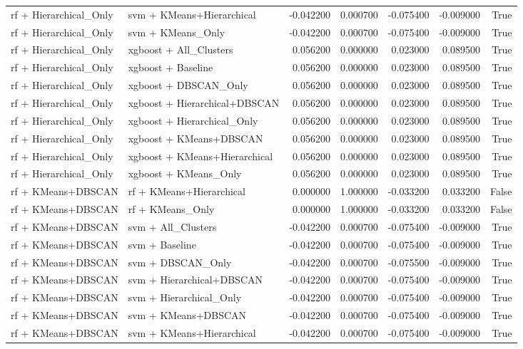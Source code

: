 \begin{tabular}{llrrrrr}
rf + Hierarchical_Only & svm + KMeans+Hierarchical & -0.042200 & 0.000700 & -0.075400 & -0.009000 & True \\
rf + Hierarchical_Only & svm + KMeans_Only & -0.042200 & 0.000700 & -0.075400 & -0.009000 & True \\
rf + Hierarchical_Only & xgboost + All_Clusters & 0.056200 & 0.000000 & 0.023000 & 0.089500 & True \\
rf + Hierarchical_Only & xgboost + Baseline & 0.056200 & 0.000000 & 0.023000 & 0.089500 & True \\
rf + Hierarchical_Only & xgboost + DBSCAN_Only & 0.056200 & 0.000000 & 0.023000 & 0.089500 & True \\
rf + Hierarchical_Only & xgboost + Hierarchical+DBSCAN & 0.056200 & 0.000000 & 0.023000 & 0.089500 & True \\
rf + Hierarchical_Only & xgboost + Hierarchical_Only & 0.056200 & 0.000000 & 0.023000 & 0.089500 & True \\
rf + Hierarchical_Only & xgboost + KMeans+DBSCAN & 0.056200 & 0.000000 & 0.023000 & 0.089500 & True \\
rf + Hierarchical_Only & xgboost + KMeans+Hierarchical & 0.056200 & 0.000000 & 0.023000 & 0.089500 & True \\
rf + Hierarchical_Only & xgboost + KMeans_Only & 0.056200 & 0.000000 & 0.023000 & 0.089500 & True \\
rf + KMeans+DBSCAN & rf + KMeans+Hierarchical & 0.000000 & 1.000000 & -0.033200 & 0.033200 & False \\
rf + KMeans+DBSCAN & rf + KMeans_Only & 0.000000 & 1.000000 & -0.033200 & 0.033200 & False \\
rf + KMeans+DBSCAN & svm + All_Clusters & -0.042200 & 0.000700 & -0.075400 & -0.009000 & True \\
rf + KMeans+DBSCAN & svm + Baseline & -0.042200 & 0.000700 & -0.075400 & -0.009000 & True \\
rf + KMeans+DBSCAN & svm + DBSCAN_Only & -0.042200 & 0.000700 & -0.075500 & -0.009000 & True \\
rf + KMeans+DBSCAN & svm + Hierarchical+DBSCAN & -0.042200 & 0.000700 & -0.075400 & -0.009000 & True \\
rf + KMeans+DBSCAN & svm + Hierarchical_Only & -0.042200 & 0.000700 & -0.075400 & -0.009000 & True \\
rf + KMeans+DBSCAN & svm + KMeans+DBSCAN & -0.042200 & 0.000700 & -0.075400 & -0.009000 & True \\
rf + KMeans+DBSCAN & svm + KMeans+Hierarchical & -0.042200 & 0.000700 & -0.075400 & -0.009000 & True \\

\end{tabular}
